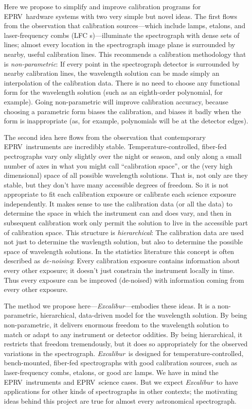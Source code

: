 \documentclass[12pt, letterpaper]{article}
\newcommand{\project}[1]{\textsl{#1}}
\newcommand{\name}{\project{Excalibur}}
\newcommand{\acronym}[1]{{\small{#1}}}
\newcommand{\eprv}{\acronym{EPRV}}
\newcommand{\lfc}{\acronym{LFC}}
\begin{document}
Here we propose to simplify and improve calibration programs for
\eprv\ hardware systems with two very simple but novel ideas.
The first flows from the observation that calibration sources---which
include lamps, etalons, and laser-frequency combs (\lfc
s)---illuminate the spectrograph with dense sets of lines; almost every
location in the spectrograph image plane is surrounded by nearby,
useful calibration lines.
This recommends a calibration methodology that is
\emph{non-parametric}:
If every point in the spectrograph detector is surrounded by nearby
calibration lines, the wavelength solution can be made simply an
interpolation of the calibration data.
There is no need to choose any functional form for the wavelength
solution (such as an eighth-order polynomial, for example).
Going non-parametric will improve calibration accuracy, because
choosing a parametric form biases the calibration, and biases it
badly when the form is inappropriate (as, for example, polynomials
will be at the detector edges).

The second idea here flows from the observation that contemporary
\eprv\ instruments are incredibly stable.
Temperature-controlled, fiber-fed pectrographs vary only slightly over
the night or season, and only along a small number of axes in what you
might call ``calibration space'', or the (very high dimensional) space
of all possible wavelength solutions.
That is, not only are they stable, but they don't have many accessible
degrees of freedom.
So it is not appropriate to fit each calibration exposure or calibrate
each science exposure independently.
It makes sense to use the calibration data (or all the data) to
determine the space in which the instrument can and does vary, and
then in subsequent calibration work only permit the solution to live
in the accessible part of calibration space.
This structure is \emph{hierarchical}: The calibration data are used
not just to determine the wavlength solution, but also to determine
the possible space of wavelength solutions.
In the statistics literature this concept is often described as
\emph{de-noising}:
Every calibration exposure contains information about every other
exposure; it doesn't just constrain the instrument locally in time.
Thus every exposure can be improved (de-noised) with information
coming from every other exposure.

The method we propose here---\name---embodies these ideas.
It is a non-parametric, hierarchical, data-driven model for the
wavelength solution.
By being non-parametric, it delivers enormous freedom to the
wavelength solution to match or adapt to any instrument or detector
oddities.
By being hierarchical, it restricts that freedom tremendously, but it
does so appropriately for the observed variations in the
spectrograph.
\name\ is designed for temperature-controlled, bench-mounted, fiber-fed
spectrographs with good calibration sources, such as laser-frequency
combs, etalons, or good arc lamps.
We have in mind the \eprv\ instruments and \eprv\ science cases.
But we expect \name\ to have applications for other kinds of
spectrographs in other contexts; the motivating ideas behind this
project are true for almost every astronomical spectrograph.
\end{document}
